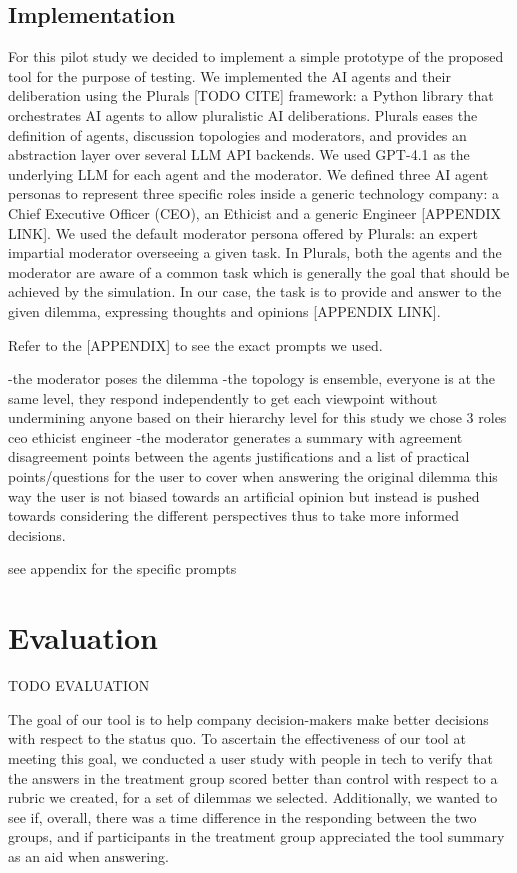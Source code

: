 \documentclass[sigconf, authorversion, nonacm, screen]{acmart}
\begin{document}
\subsection{Implementation}

For this pilot study we decided to implement a simple prototype of the proposed tool for the purpose of testing.
We implemented the AI agents and their deliberation using the Plurals [TODO CITE] framework: a Python library that orchestrates AI agents to allow pluralistic AI deliberations.
Plurals eases the definition of agents, discussion topologies and moderators, and provides an abstraction layer over several LLM API backends.
We used GPT-4.1 as the underlying LLM for each agent and the moderator.
We defined three AI agent personas to represent three specific roles inside a generic technology company: a Chief Executive Officer (CEO), an Ethicist and a generic Engineer [APPENDIX LINK].
We used the default moderator persona offered by Plurals: an expert impartial moderator overseeing a given task.
In Plurals, both the agents and the moderator are aware of a common task which is generally the goal that should be achieved by the simulation.
In our case, the task is to provide and answer to the given dilemma, expressing thoughts and opinions [APPENDIX LINK].

Refer to the [APPENDIX] to see the exact prompts we used.

-the moderator poses the dilemma
-the topology is ensemble, everyone is at the same level, they respond independently to get each viewpoint without undermining anyone based on their hierarchy level
for this study we chose 3 roles ceo ethicist engineer
-the moderator generates a summary with agreement disagreement points between the agents justifications and a list of practical points/questions for the user to cover when answering the original dilemma
this way the user is not biased towards an artificial opinion but instead is pushed towards considering the different perspectives thus to take more informed decisions.

see appendix for the specific prompts

\section{Evaluation}

TODO EVALUATION

The goal of our tool is to help company decision-makers make better decisions with respect to the status quo.
To ascertain the effectiveness of our tool at meeting this goal, we conducted a user study with people in tech to verify that the answers in the treatment group scored better than control with respect to a rubric we created, for a set of dilemmas we selected.
Additionally, we wanted to see if, overall, there was a time difference in the responding between the two groups, and if participants in the treatment group appreciated the tool summary as an aid when answering.
\end{document}
